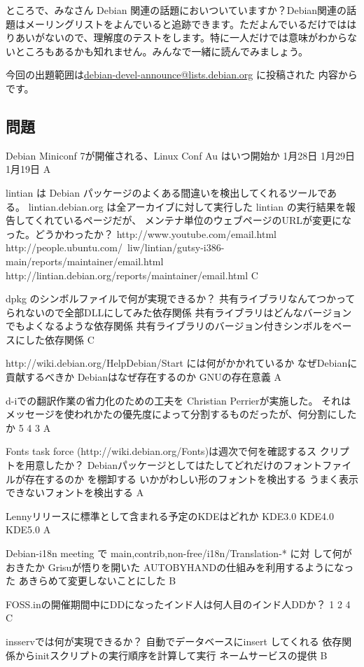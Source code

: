 \documentclass[mingoth,a4paper]{jsarticle}
\begin{document}

ところで、みなさん Debian 関連の話題においついていますか？Debian関連の話
題はメーリングリストをよんでいると追跡できます。ただよんでいるだけではは
りあいがないので、理解度のテストをします。特に一人だけでは意味がわからな
いところもあるかも知れません。みんなで一緒に読んでみましょう。

今回の出題範囲は\url{debian-devel-announce@lists.debian.org} に投稿された
内容からです。
\begin{multicols}{2}
 
 \subsection{問題}

 \santaku
 {Debian Miniconf 7が開催される、Linux Conf Au はいつ開始か}
 {1月28日}
 {1月29日}
 {1月19日}
 {A}

 \santaku
 {lintian は Debian パッケージのよくある間違いを検出してくれるツールであ
 る。 lintian.debian.org は全アーカイブに対して実行した lintian の実行結果を報告してくれているページだが、
 メンテナ単位のウェブページのURLが変更になった。どうかわったか？}
 {http://www.youtube.com/email.html}
 {http://people.ubuntu.com/~liw/lintian/gutsy-i386-main/reports/maintainer/email.html}
 {http://lintian.debian.org/reports/maintainer/email.html}
 {C}

 \santaku
 {dpkg のシンボルファイルで何が実現できるか？}
 {共有ライブラリなんてつかってられないので全部DLLにしてみた依存関係}
 {共有ライブラリはどんなバージョンでもよくなるような依存関係}
 {共有ライブラリのバージョン付きシンボルをベースにした依存関係}
 {C}

 \santaku
 {http://wiki.debian.org/HelpDebian/Start には何がかかれているか}
 {なぜDebianに貢献するべきか}
 {Debianはなぜ存在するのか}
 {GNUの存在意義}
 {A}

 \santaku
 {d-iでの翻訳作業の省力化のための工夫を Christian Perrierが実施した。
 それはメッセージを使われかたの優先度によって分割するものだったが、何分割にしたか}
 {5}
 {4}
 {3}
 {A}

 \santaku
 {Fonts task force (http://wiki.debian.org/Fonts)は週次で何を確認するス
 クリプトを用意したか？}
 {Debianパッケージとしてはたしてどれだけのフォントファイルが存在するのか
 を棚卸する}
 {いかがわしい形のフォントを検出する}
 {うまく表示できないフォントを検出する}
 {A}

 \santaku
 {Lennyリリースに標準として含まれる予定のKDEはどれか}
 {KDE3.0}
 {KDE4.0}
 {KDE5.0}
 {A}

 \santaku
 {Debian-i18n meeting で {main,contrib,non-free}/i18n/Translation-* に対
 して何がおきたか}
 {Grisuが悟りを開いた}
 {AUTOBYHANDの仕組みを利用するようになった}
 {あきらめて変更しないことにした}
 {B}

 \santaku
 {FOSS.inの開催期間中にDDになったインド人は何人目のインド人DDか？}
 {1}
 {2}
 {4}
 {C}

 \santaku
 {insservでは何が実現できるか？}
 {自動でデータベースにinsert してくれる}
 {依存関係からinitスクリプトの実行順序を計算して実行}
 {ネームサービスの提供}
 {B}

\end{multicols}
\end{document}
